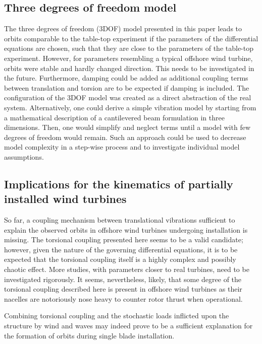 \documentclass{article}
\begin{document}
\subsection{Three degrees of freedom model}

The three degrees of freedom (3DOF) model presented in this paper leads to orbits comparable to the table-top experiment if the parameters of the differential equations are chosen, such that they are close to the parameters of the table-top experiment. However, for parameters resembling a typical offshore wind turbine, orbits were stable and  hardly changed direction. This needs to be investigated in the future. Furthermore, damping could be added as additional coupling terms between translation and torsion are to be expected if damping is included. The configuration of the 3DOF model was created as a direct abstraction of the real system. Alternatively, one could derive a simple vibration model by starting from a mathematical description of a cantilevered beam formulation in three dimensions. Then, one would simplify and neglect terms until a model with few degrees of freedom would remain. Such an approach could be used to decrease model complexity in a step-wise process and to investigate individual model assumptions.

\subsection{Implications for the kinematics of partially installed wind turbines}

So far, a coupling mechanism between translational vibrations sufficient to explain the observed orbits in offshore wind turbines undergoing installation is missing. The torsional coupling presented here seems to be a valid candidate; however, given the nature of the governing differential equations, it is to be expected that the torsional coupling itself is a highly complex and possibly chaotic effect. More studies, with parameters closer to real turbines, need to be investigated rigorously. It seems, nevertheless, likely, that some degree of the torsional coupling described here is present in offshore wind turbines as their nacelles are notoriously nose heavy to counter rotor thrust when operational. 

Combining torsional coupling and the stochastic loads inflicted upon the structure by wind and waves may indeed prove to be a sufficient explanation for the formation of orbits during single blade installation.

\clearpage


\end{document}
